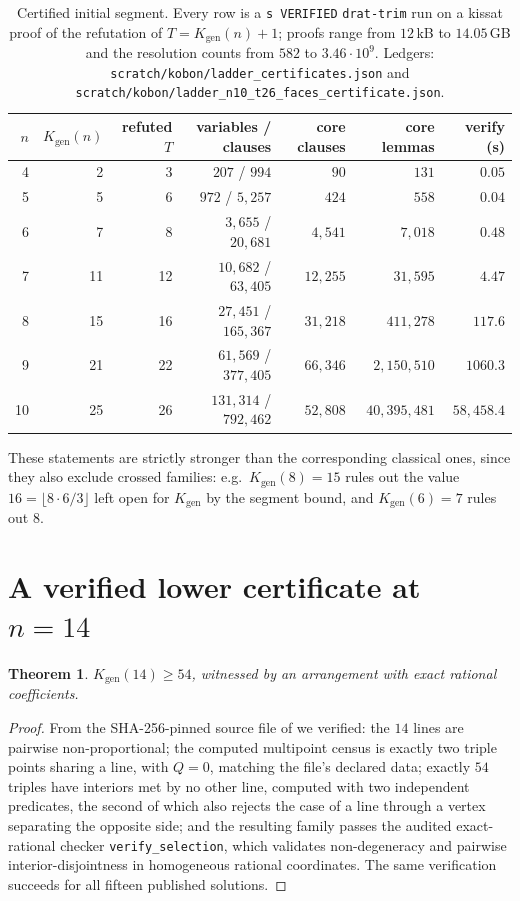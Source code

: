 \documentclass[11pt]{article}
\newtheorem{theorem}{Theorem}
\theoremstyle{definition}
\newcommand{\Kgen}{K_{\mathrm{gen}}}
\begin{document}
\begin{table}[t]
\centering
\begin{tabular}{rrrrrrr}
\toprule
$n$ & $\Kgen(n)$ & refuted $T$ & variables / clauses & core clauses &
core lemmas & verify (s)\\
\midrule
4 & 2 & 3 & $207$ / $994$ & $90$ & $131$ & $0.05$\\
5 & 5 & 6 & $972$ / $5{,}257$ & $424$ & $558$ & $0.04$\\
6 & 7 & 8 & $3{,}655$ / $20{,}681$ & $4{,}541$ & $7{,}018$ & $0.48$\\
7 & 11 & 12 & $10{,}682$ / $63{,}405$ & $12{,}255$ & $31{,}595$ & $4.47$\\
8 & 15 & 16 & $27{,}451$ / $165{,}367$ & $31{,}218$ & $411{,}278$ & $117.6$\\
9 & 21 & 22 & $61{,}569$ / $377{,}405$ & $66{,}346$ & $2{,}150{,}510$ & $1060.3$\\
10 & 25 & 26 & $131{,}314$ / $792{,}462$ & $52{,}808$ & $40{,}395{,}481$ & $58{,}458.4$\\
\bottomrule
\end{tabular}
\caption{Certified initial segment. Every row is a \texttt{s VERIFIED}
\texttt{drat-trim} run on a kissat proof of the refutation of
$T=\Kgen(n)+1$; proofs range from $12$\,kB to $14.05$\,GB and the resolution
counts from $582$ to $3.46\cdot 10^9$. Ledgers:
\texttt{scratch/kobon/ladder\_certificates.json} and
\texttt{scratch/kobon/ladder\_n10\_t26\_faces\_certificate.json}.}
\label{tab:ladder}
\end{table}

These statements are strictly stronger than the corresponding classical ones,
since they also exclude crossed families: e.g.\ $\Kgen(8)=15$ rules out the
value $16=\lfloor 8\cdot 6/3\rfloor$ left open for $\Kgen$ by the segment
bound, and $\Kgen(6)=7$ rules out $8$.

\section{A verified lower certificate at $n=14$}

\begin{theorem}\label{thm:54}
$\Kgen(14)\ge54$, witnessed by an arrangement with exact rational
coefficients.
\end{theorem}

\begin{proof}
From the SHA-256-pinned source file of \cite{Maiorana} we verified: the $14$
lines are pairwise non-proportional; the computed multipoint census is exactly
two triple points sharing a line, with $Q=0$, matching the file's declared
data; exactly $54$ triples have interiors met by no other line, computed with
two independent predicates, the second of which also rejects the case of a
line through a vertex separating the opposite side; and the resulting family
passes the audited exact-rational checker \texttt{verify\_selection}, which
validates non-degeneracy and pairwise interior-disjointness in homogeneous
rational coordinates. The same verification succeeds for all fifteen
published solutions.
\end{proof}
\end{document}

